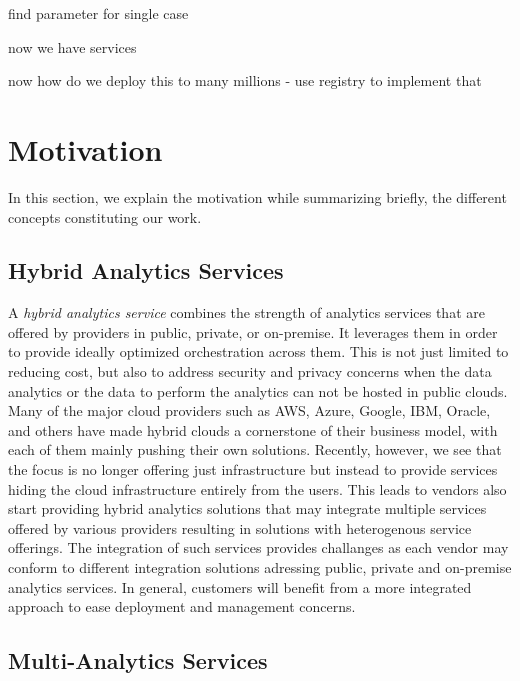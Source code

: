 


find parameter for single case

now we have services

now how do we deploy this to many millions - use registry to implement that




\section{Motivation}\label{s:background}

In this section, we explain the motivation  while summarizing
briefly, the different concepts constituting our work.

\subsection{Hybrid Analytics Services}

A {\em hybrid analytics service} combines the strength of analytics
services that are offered by providers in public, private, or
on-premise. It leverages them in order to provide ideally optimized
orchestration across them. This is not just limited to reducing cost,
but also to address security and privacy concerns when the data
analytics or the data to perform the analytics can not be hosted in
public clouds. Many of the major cloud providers such as AWS, Azure,
Google, IBM, Oracle, and others have made hybrid clouds a cornerstone
of their business model, with each of them mainly pushing their own
solutions. Recently, however, we see that the focus is no longer
offering just infrastructure but instead to provide services hiding the
cloud infrastructure entirely from the users.  This leads to vendors
also start providing hybrid analytics solutions that may integrate
multiple services offered by various providers resulting in solutions
with heterogenous service offerings. The integration of such services
provides challanges as each vendor may conform to different
integration solutions adressing public, private and on-premise
analytics services. In general, customers will benefit from a more
integrated approach to ease deployment and management concerns.

\subsection{Multi-Analytics Services}

